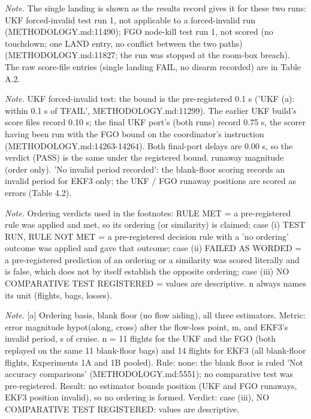\begin{table}[htbp]
\textit{Note.} \textdaggerdbl{} The single landing is shown as the results record gives it for these two runs: UKF forced-invalid test run 1, not applicable to a forced-invalid run (METHODOLOGY.md:11490); FGO node-kill test run 1, not scored (no touchdown; one LAND entry, no conflict between the two paths) (METHODOLOGY.md:11827; the run was stopped at the room-box breach). The raw score-file entries (single landing FAIL, no disarm recorded) are in Table A.2.\par
\textit{Note.} UKF forced-invalid test: the bound is the pre-registered 0.1 s ('UKF (a): within 0.1 s of TFAIL', METHODOLOGY.md:11299). The earlier UKF build's score files record 0.10 s; the final UKF port's (both runs) record 0.75 s, the scorer having been run with the FGO bound on the coordinator's instruction (METHODOLOGY.md:14263-14264). Both final-port delays are 0.00 s, so the verdict (PASS) is the same under the registered bound. \textdagger{} runaway magnitude (order only). 'No invalid period recorded': the blank-floor scoring records an invalid period for EKF3 only; the UKF / FGO runaway positions are scored as errors (Table 4.2).\par
\textit{Note.} Ordering verdicts used in the footnotes: RULE MET = a pre-registered rule was applied and met, so its ordering (or similarity) is claimed; case (i) TEST RUN, RULE NOT MET = a pre-registered decision rule with a 'no ordering' outcome was applied and gave that outcome; case (ii) FAILED AS WORDED = a pre-registered prediction of an ordering or a similarity was scored literally and is false, which does not by itself establish the opposite ordering; case (iii) NO COMPARATIVE TEST REGISTERED = values are descriptive. n always names its unit (flights, bags, losses).\par
\textit{Note.} [a] Ordering basis, blank floor (no flow aiding), all three estimators. Metric: error magnitude hypot(along, cross) after the flow-loss point, m, and EKF3's invalid period, s of cruise. n = 11 flights for the UKF and the FGO (both replayed on the same 11 blank-floor bags) and 14 flights for EKF3 (all blank-floor flights, Experiments 1A and 1B pooled). Rule: none: the blank floor is ruled 'Not accuracy comparisons' (METHODOLOGY.md:5551); no comparative test was pre-registered. Result: no estimator bounds position (UKF and FGO runaways, EKF3 position invalid), so no ordering is formed. Verdict: case (iii), NO COMPARATIVE TEST REGISTERED: values are descriptive.\par

\end{table}
